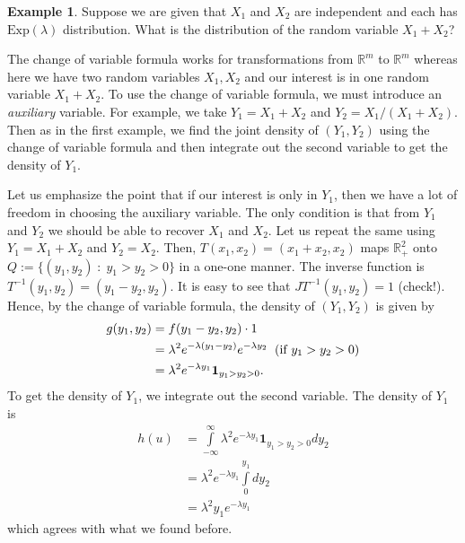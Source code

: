 \documentclass[preprint,  11pt]{amsart}
\theoremstyle{plain} %
\theoremstyle{definition} %
\newtheorem{example}[theorem]{Example}
\begin{document}
\begin{example} Suppose we are given that $X_{1}$ and $X_{2}$ are independent and each has $\mbox{Exp}(\lambda)$ distribution. What is the distribution of the random variable $X_{1}+X_{2}$? 

The change of variable formula works for transformations from $\mathbb{R}^{m}$ to $\mathbb{R}^{m}$ whereas here we have two random variables $X_{1},X_{2}$ and our interest is in one random variable $X_{1}+X_{2}$. To use the change of variable formula, we must introduce an {\em auxiliary} variable. For example, we take $Y_{1}=X_{1}+X_{2}$ and $Y_{2}=X_{1}/(X_{1}+X_{2})$. Then as in the first example, we find the joint density of $(Y_{1},Y_{2})$ using the change of variable formula and then integrate out the second variable to get the density of $Y_{1}$. 

Let us emphasize the point that if our interest is only in $Y_{1}$, then we have a lot of freedom in choosing the auxiliary variable. The only condition is that from $Y_{1}$ and $Y_{2}$ we should be able to recover $X_{1}$ and $X_{2}$. Let us repeat the same using $Y_{1}=X_{1}+X_{2}$ and $Y_{2}=X_{2}$. Then, $T(x_{1},x_{2})=(x_{1}+x_{2},x_{2})$ maps $\mathbb{R}_{+}^{2}$ onto $Q:=\{(y_{1},y_{2}){\; : \;} y_{1}>y_{2}>0\}$ in a one-one manner. The inverse function is $T^{-1}(y_{1},y_{2})=(y_{1}-y_{2},y_{2})$. It is easy to see that $JT^{-1}(y_{1},y_{2})=1$ (check!). Hence,  by the change of variable formula, the density of $(Y_{1},Y_{2})$ is given by 
\begin{align*}
g(y_{1},y_{2}) &= f(y_{1}-y_{2},y_{2})\cdot 1 \\
&= \lambda^{2}e^{-\lambda(y_{1}-y_{2})}e^{-\lambda y_{2}} \hspace{2mm}(\mbox{if }y_{1}>y_{2}>0) \\
&= \lambda^{2}e^{-\lambda y_{1}}{\mathbf 1}_{y_{1}>y_{2}>0}.
\end{align*}
To get the density of $Y_{1}$, we integrate out the second variable. The density of $Y_{1}$ is 
\begin{align*}
h(u) &= \int\limits_{-\infty}^{\infty}\lambda^{2}e^{-\lambda y_{1}}{\mathbf 1}_{y_{1}>y_{2}>0} dy_{2} \\
&= \lambda^{2}e^{-\lambda y_{1}}\int\limits_{0}^{y_{1}}dy_{2} \\
&= \lambda^{2}y_{1}e^{-\lambda y_{1}}
\end{align*}
which agrees with what we found before. 
\end{example}
\end{document}
